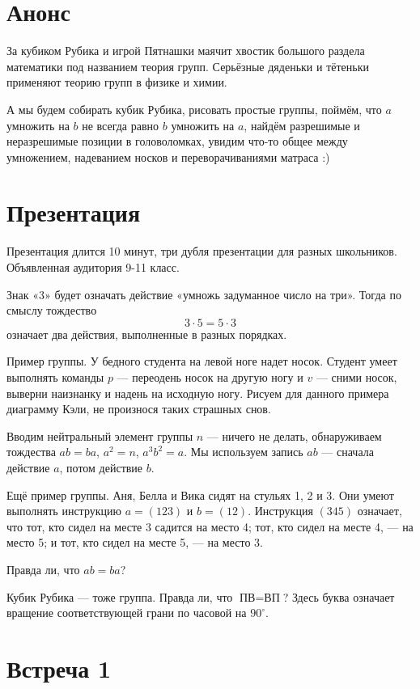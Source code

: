 \documentclass[a4paper, 12pt]{article}
\begin{document}
\section{Анонс}

За кубиком Рубика и игрой Пятнашки маячит хвостик большого раздела математики под названием теория групп. Серьёзные дяденьки и тётеньки применяют теорию групп в физике и химии. 

А мы будем собирать кубик Рубика, рисовать простые группы, поймём, что $a$ умножить на $b$ не всегда равно $b$ умножить на $a$, найдём разрешимые и неразрешимые позиции в головоломках, увидим что-то общее между умножением, надеванием носков и переворачиваниями матраса :)

\section{Презентация}

Презентация длится 10 минут, три дубля презентации для разных школьников. 
Объявленная аудитория 9-11 класс.

Знак «3» будет означать действие «умножь задуманное число на три». Тогда по смыслу тождество
\[
3 \cdot 5 = 5 \cdot 3
\]
означает два действия, выполненные в разных порядках.

Пример группы. У бедного студента на левой ноге надет носок. Студент умеет выполнять команды $p$ — переодень носок на другую ногу и $v$ — сними носок, выверни наизнанку и надень на исходную ногу. Рисуем для данного примера диаграмму Кэли, не произнося таких страшных снов.

Вводим нейтральный элемент группы $n$ — ничего не делать, обнаруживаем тождества $ab=ba$, $a^2=n$, $a^3b^2=a$. Мы используем запись $ab$ — сначала действие $a$, потом действие $b$.

Ещё пример группы. Аня, Белла и Вика сидят на стульях 1, 2 и 3. Они умеют выполнять инструкцию $a=(123)$ и $b=(12)$. Инструкция $(345)$ означает, что тот, кто сидел на месте 3 садится на место 4; тот, кто сидел на месте 4, — на место 5; и тот, кто сидел на месте 5, — на место 3.

Правда ли, что $ab=ba$?

Кубик Рубика — тоже группа. Правда ли, что $\text{П}\text{В}=\text{В}\text{П}$? Здесь буква означает вращение соответствующей грани по часовой на $90^{\circ}$.


\newpage
\section{Встреча 1}
\end{document}
